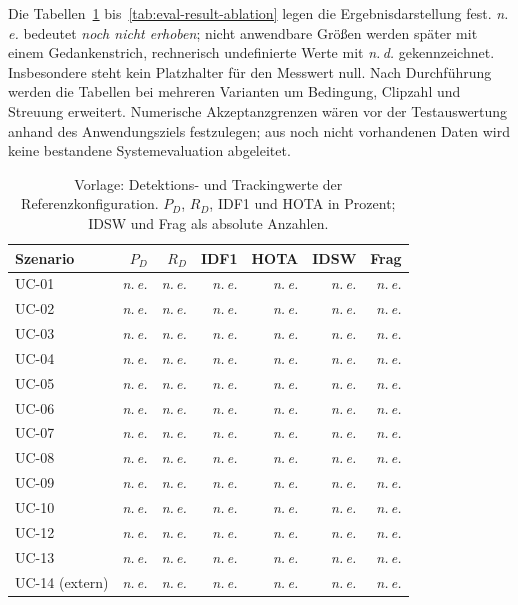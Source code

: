 \documentclass[runningheads]{llncs}
\newcommand{\evalpending}{\textit{n.\,e.}}
\begin{document}
Die Tabellen~\ref{tab:eval-result-tracking} bis~\ref{tab:eval-result-ablation} legen die Ergebnisdarstellung fest. \evalpending{} bedeutet \emph{noch nicht erhoben}; nicht anwendbare Größen werden später mit einem Gedankenstrich, rechnerisch undefinierte Werte mit \emph{n.\,d.} gekennzeichnet. Insbesondere steht kein Platzhalter für den Messwert null. Nach Durchführung werden die Tabellen bei mehreren Varianten um Bedingung, Clipzahl und Streuung erweitert. Numerische Akzeptanzgrenzen wären vor der Testauswertung anhand des Anwendungsziels festzulegen; aus noch nicht vorhandenen Daten wird keine bestandene Systemevaluation abgeleitet.

\begin{table}[tbp]
\caption{Vorlage: Detektions- und Trackingwerte der Referenzkonfiguration. $P_D$, $R_D$, IDF1 und HOTA in Prozent; IDSW und Frag als absolute Anzahlen.}
\label{tab:eval-result-tracking}
\centering
\small
\begin{tabularx}{\linewidth}{@{}Xrrrrrr@{}}
\toprule
Szenario & $P_D$ & $R_D$ & IDF1 & HOTA & IDSW & Frag \\
\midrule
UC-01 & \evalpending & \evalpending & \evalpending & \evalpending & \evalpending & \evalpending \\
UC-02 & \evalpending & \evalpending & \evalpending & \evalpending & \evalpending & \evalpending \\
UC-03 & \evalpending & \evalpending & \evalpending & \evalpending & \evalpending & \evalpending \\
UC-04 & \evalpending & \evalpending & \evalpending & \evalpending & \evalpending & \evalpending \\
UC-05 & \evalpending & \evalpending & \evalpending & \evalpending & \evalpending & \evalpending \\
UC-06 & \evalpending & \evalpending & \evalpending & \evalpending & \evalpending & \evalpending \\
UC-07 & \evalpending & \evalpending & \evalpending & \evalpending & \evalpending & \evalpending \\
UC-08 & \evalpending & \evalpending & \evalpending & \evalpending & \evalpending & \evalpending \\
UC-09 & \evalpending & \evalpending & \evalpending & \evalpending & \evalpending & \evalpending \\
UC-10 & \evalpending & \evalpending & \evalpending & \evalpending & \evalpending & \evalpending \\
UC-12 & \evalpending & \evalpending & \evalpending & \evalpending & \evalpending & \evalpending \\
UC-13 & \evalpending & \evalpending & \evalpending & \evalpending & \evalpending & \evalpending \\
UC-14 (extern) & \evalpending & \evalpending & \evalpending & \evalpending & \evalpending & \evalpending \\
\bottomrule
\end{tabularx}
\end{table}
\end{document}
